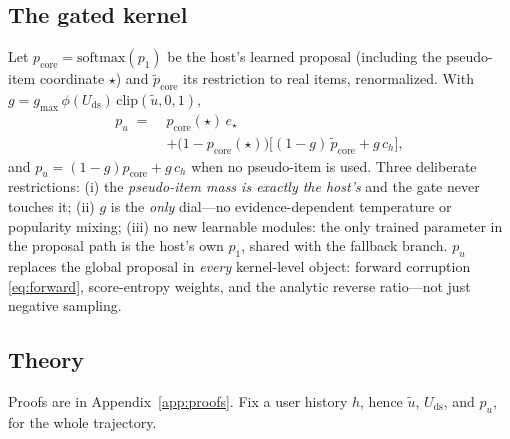 \documentclass[letterpaper]{article}
\newcommand{\pcore}{p_{\mathrm{core}}}
\newcommand{\pcorer}{\tilde{p}_{\mathrm{core}}}
\newcommand{\ch}{c_{h}}
\newcommand{\pu}{p_{u}}
\newcommand{\ut}{\tilde{u}}
\newcommand{\Uds}{U_{\mathrm{ds}}}
\newcommand{\phids}{\phi(\Uds)}
\begin{document}
\subsection{The gated kernel}
Let $\pcore=\mathrm{softmax}(p_1)$ be the host's learned proposal
(including the pseudo-item coordinate $\star$) and $\pcorer$ its
restriction to real items, renormalized. With
$g=g_{\max}\,\phids\,\mathrm{clip}(\ut,0,1)$,
\begin{equation}
\begin{aligned}
  \pu \;=\;& \pcore(\star)\, e_\star \\
  &+ \big(1-\pcore(\star)\big)\Big[(1-g)\,\pcorer + g\,\ch\Big],
\end{aligned}
\label{eq:pu}
\end{equation}
and $\pu=(1-g)\pcore+g\,\ch$ when no pseudo-item is used. Three
deliberate restrictions: (i) the \emph{pseudo-item mass is exactly the
host's} and the gate never touches it; (ii) $g$ is the \emph{only}
dial---no evidence-dependent temperature or popularity mixing; (iii) no
new learnable modules: the only trained parameter in the proposal path
is the host's own $p_1$, shared with the fallback branch. $\pu$
replaces the global proposal in \emph{every} kernel-level object:
forward corruption \eqref{eq:forward}, score-entropy weights, and the
analytic reverse ratio---not just negative sampling.

\subsection{Theory}
\label{sec:theory}
Proofs are in Appendix~\ref{app:proofs}. Fix a user history $h$, hence
$\ut$, $\Uds$, and $\pu$, for the whole trajectory.
\end{document}
